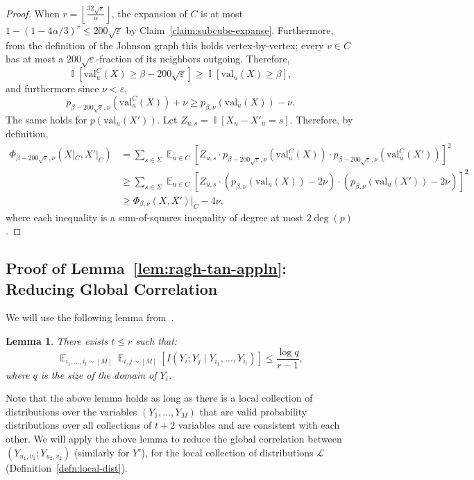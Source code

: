 \documentclass[11pt]{article}
\DeclareMathOperator*{\E}{\mathbb{E}}
\DeclareMathOperator*{\Ind}{\mathbb{I}}
\def \cL {\mathcal{L}}
\def \eps {{\varepsilon}}
\def \val {\mathrm{val}}
\newtheorem{lemma}[theorem]{Lemma}
\theoremstyle{definition}
\begin{document}
\begin{proof}
When $r = \left\lfloor\frac{32\sqrt{\eps}}{\alpha}\right\rfloor$, the expansion of $C$ is at most $1 - (1-4\alpha/3)^r \le 200\sqrt{\eps}$ by Claim~\ref{claim:subcube-expanse}.
Furthermore, from the definition of the Johnson graph this holds vertex-by-vertex; every $v \in C$ has at most a $200\sqrt{\eps}$-fraction of its neighbors outgoing.
Therefore,
\[
\Ind[\val_u^C(X) \ge \beta - 200\sqrt{\eps}] \ge \Ind[\val_u(X) \ge \beta],
\]
and furthermore since $\nu < \eps$,
\[
p_{\beta - 200 \sqrt{\eps},\nu}(\val_u^C(X)) + \nu \ge p_{\beta,\nu}(\val_u(X)) - \nu.
\]
The same holds for $p(\val_u(X'))$. Let $Z_{u,s} = \Ind[X_u - X'_u = s]$. Therefore, by definition,
\begin{align*}
    \Phi_{\beta - 200\sqrt{\eps},\nu}(X|_C,X'|_C)
    &= \sum_{s \in \Sigma} \E_{u \in C}\left[Z_{u,s}\cdot p_{\beta-200\sqrt{\eps},\nu}(\val_u^C(X))\cdot p_{\beta-200\sqrt{\eps},\nu}(\val_u^C(X'))\right]^2\\
    &\ge \sum_{s \in \Sigma} \E_{u \in C}\left[Z_{u,s}\cdot (p_{\beta,\nu}(\val_u(X)) - 2\nu)\cdot (p_{\beta,\nu}(\val_u(X')) - 2\nu)\right]^2\\
    &\ge \Phi_{\beta,\nu}(X,X')|_C - 4\nu,
\end{align*}
where each inequality is a sum-of-squares inequality of degree at most $2\deg(p)$.
\end{proof}








\subsection{Proof of Lemma~\ref{lem:ragh-tan-appln}: Reducing Global Correlation}\label{sec:ragh}
We will use the following lemma from~\cite{RT12}.

\begin{lemma}\label{lem:ragh-tan}
There exists $t \leq r$ such that: 
\[\E_{i_1,\ldots,i_t \sim [M]}\E_{i,j \sim [M]}[I(Y_i;Y_j \mid Y_{i_1}, \ldots,Y_{i_t})] \leq \frac{\log q}{r - 1},\]
where $q$ is the size of the domain of $Y_i$.
\end{lemma}

Note that the above lemma holds as long as there is a local collection of distributions over the variables $(Y_1,\ldots,Y_M)$ that are valid probability distributions over all collections of $t+2$ variables and are consistent with each other. We will apply the above lemma to reduce the global correlation between $(Y_{u_1,v_1};Y_{u_2,v_2})$ (similarly for $Y'$), for the local collection of distributions $\cL$ (Definition~\ref{defn:local-dist}).
\end{document}
